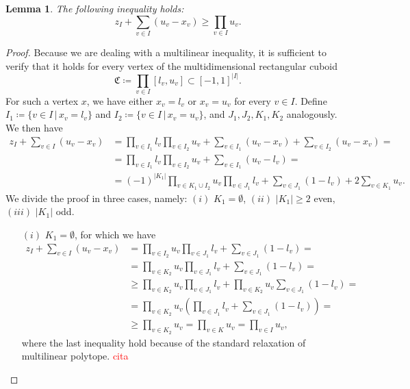 \documentclass{article}
\newtheorem{lemma}[theorem]{Lemma}
\begin{document}
	\begin{lemma}
		The following inequality holds:
		\begin{equation}
			z_I + \sum_{v \in I} (u_v - x_v) \geq \prod_{v \in I} u_v. \label{eq:ineq-lb}
		\end{equation}
	\end{lemma}
	\begin{proof}
		Because we are dealing with a multilinear inequality, it is sufficient to verify that it holds for every vertex of the multidimensional rectangular cuboid
		\begin{equation*}
			\mathfrak{C} \coloneqq \prod_{v \in I} [l_v, u_v] \subset [-1, 1]^{|I|}.
		\end{equation*} For such a vertex \(x\), we have either \(x_v = l_v\) or \(x_v = u_v\) for every \(v \in I\). Define \(I_1 \coloneqq \{v \in I \, | \, x_v = l_v\}\) and \(I_2 \coloneqq \{v \in I \, | \, x_v = u_v\}\), and \(J_1, J_2, K_1, K_2\) analogously. We then have
		\begin{align*}
			z_I + \sum_{v \in I} (u_v - x_v) & = \prod_{v \in I_1} l_v \prod_{v \in I_2} u_v+ \sum_{v \in I_1} (u_v - x_v) + \sum_{v \in I_2} (u_v - x_v) = \\
			& =  \prod_{v \in I_1} l_v \prod_{v \in I_2} u_v+ \sum_{v \in I_1} (u_v - l_v)= \\
			& =   (-1)^{|K_1|}\prod_{v \in K_1 \cup I_2}u_v \prod_{v \in J_1} l_v+ \sum_{v \in J_1} (1 - l_v) + 2\sum_{v \in K_1}u_v.
		\end{align*}
		We divide the proof in three cases, namely: \((i)\) \(K_1 = \emptyset \), \((ii)\) \(|K_1| \geq 2\) even, \((iii)\) \(|K_1| \) odd.
		\begin{itemize}
			\item[\((i)\)] \(K_1 = \emptyset \), for which we have
			\begin{align*}
				z_I + \sum_{v \in I} (u_v - x_v) & = \prod_{v \in I_2}u_v \prod_{v \in J_1} l_v+ \sum_{v \in J_1} (1 - l_v) =\\
				&= \prod_{v \in K_2}u_v \prod_{v \in J_1} l_v+ \sum_{v \in J_1} (1 - l_v) =\\
				& \geq \prod_{v \in K_2}u_v \prod_{v \in J_1} l_v+ \prod_{v \in K_2}u_v\sum_{v \in J_1} (1 - l_v) = \\
				&= \prod_{v \in K_2}u_v (\prod_{v \in J_1} l_v+ \sum_{v \in J_1} (1 - l_v)) = \\
				&\geq \prod_{v \in K_2}u_v = \prod_{v \in K}u_v = \prod_{v \in I}u_v,
			\end{align*}
			where the last inequality hold because of the standard relaxation of multilinear polytope. \textcolor{red}{cita}

\end{itemize}
\end{proof}
\end{document}
